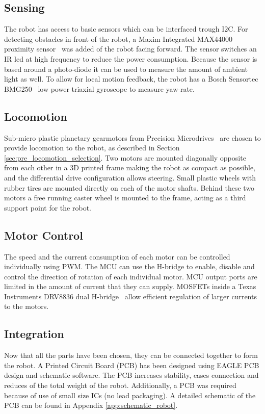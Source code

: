 \subsection{Sensing}
\label{sec:dai_sensing}

The robot has access to basic sensors which can be interfaced trough I2C.
For detecting obstacles in front of the robot, a Maxim Integrated MAX44000 proximity sensor~\cite{max44000_2017} was added of the robot facing forward.
The sensor switches an IR led at high frequency to reduce the power consumption.
Because the sensor is based around a photo-diode it can be used to measure the amount of ambient light as well.
To allow for local motion feedback, the robot has a Bosch Sensortec BMG250~\cite{bosch_bmg250_2017} low power triaxial gyroscope to measure yaw-rate.

\subsection{Locomotion}

Sub-micro plastic planetary gearmotors from Precision Microdrives~\cite{gearmotor_206-110_2017} are chosen to provide locomotion to the robot, as described in Section \ref{sec:pre_locomotion_selection}.
Two motors are mounted diagonally opposite from each other in a 3D printed frame making the robot as compact as possible, and the differential drive configuration allows steering.
Small plastic wheels with rubber tires are mounted directly on each of the motor shafts.
Behind these two motors a free running caster wheel is mounted to the frame, acting as a third support point for the robot.

\subsection{Motor Control}
\label{sec:dai_motor_control}

The speed and the current consumption of each motor can be controlled individually using PWM.
The MCU can use the H-bridge to enable, disable and control the direction of rotation of each individual motor.
MCU output ports are limited in the amount of current that they can supply.
MOSFETs inside a Texas Instruments DRV8836 dual H-bridge~\cite{drv8836_2017} allow efficient regulation of larger currents to the motors.

\subsection{Integration}
Now that all the parts have been chosen, they can be connected together to form the robot.
A Printed Circuit Board (PCB) has been designed using EAGLE PCB design and schematic software.
The PCB increases stability, eases connection and reduces of the total weight of the robot.
Additionally, a PCB was required because of use of small size ICs (no lead packaging).
A detailed schematic of the PCB can be found in Appendix \ref{app:schematic_robot}.

